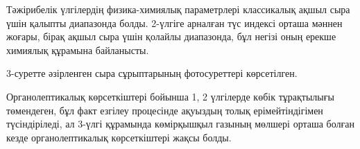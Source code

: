 
Тәжірибелік үлгілердің физика-химиялық параметрлері классикалық ақшыл
сыра үшін қалыпты диапазонда болды. 2-үлгіге арналған түс индексі орташа
мәннен жоғары, бірақ ақшыл сыра үшін қолайлы диапазонда, бұл негізі оның
ерекше химиялық құрамына байланысты.

3-суретте әзірленген сыра сұрыптарының фотосуреттері көрсетілген.

Органолептикалық көрсеткіштері бойынша 1, 2 үлгілерде көбік тұрақтылығы
төмендеген, бұл факт езгілеу процесінде ақуыздың толық ерімейтіндігімен
түсіндіріледі, ал 3-үлгі құрамында көмірқышқыл газының мөлшері орташа
болған кезде органолептикалық көрсеткіштері жақсы болды.

